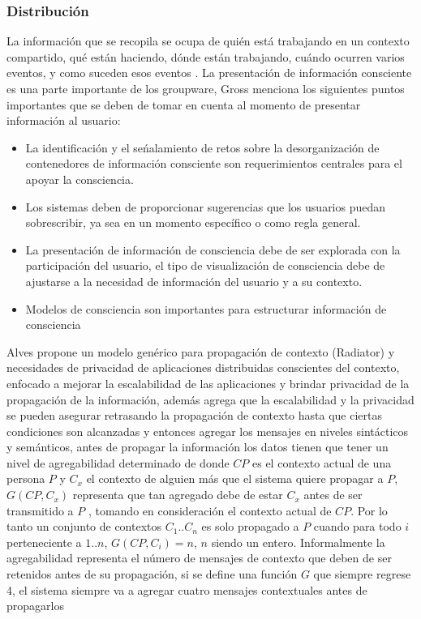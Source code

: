 \subsubsection{Distribuci\'on}
La informaci\'on que se recopila se ocupa de qui\'en est\'a trabajando en un contexto compartido, qu\'e est\'an haciendo, d\'onde est\'an trabajando, cu\'ando ocurren varios eventos, y como suceden esos eventos \cite{ardissono2012context}. La presentaci\'on de informaci\'on consciente es una parte importante de los groupware, Gross\cite{gross2013supporting} menciona los siguientes puntos importantes que se deben de tomar en cuenta al momento de presentar informaci\'on al usuario:
\begin{itemize}
\item La identificaci\'on y el se\'nalamiento de retos sobre la desorganizaci\'on de contenedores de informaci\'on consciente son requerimientos centrales para el apoyar la consciencia.
\item Los sistemas deben de proporcionar sugerencias que los usuarios puedan sobrescribir, ya sea en un momento espec\'ifico o como regla general.
\item La presentaci\'on de informaci\'on de consciencia debe de ser explorada con la participaci\'on del usuario, el tipo de visualizaci\'on de consciencia debe de ajustarse a la necesidad de informaci\'on del usuario y a su contexto.
\item Modelos de consciencia son importantes para estructurar informaci\'on de consciencia
\end{itemize}

Alves \cite{alves2013radiator} propone un modelo gen\'erico para propagaci\'on de contexto (Radiator) y necesidades de privacidad de aplicaciones distribuidas conscientes del contexto, enfocado a mejorar la escalabilidad de las aplicaciones y brindar privacidad de la propagaci\'on de la informaci\'on, adem\'as agrega que la escalabilidad y la privacidad se pueden asegurar retrasando la propagaci\'on de contexto hasta que ciertas condiciones son alcanzadas y entonces agregar los mensajes en niveles sint\'acticos y sem\'anticos, antes de propagar la informaci\'on los datos tienen que tener un nivel de agregabilidad determinado de donde  $CP$ es el contexto actual de una persona $P$ y $C_{x}$ el contexto de alguien m\'as que el sistema quiere propagar a $P$, $G( CP, C_{x} )$ representa que tan agregado debe de estar $C_{x}$ antes de ser transmitido a $P$ , tomando en consideraci\'on el contexto actual de $CP$. Por lo tanto un conjunto de contextos $C_{1}..C_{n}$ es solo propagado a $P$ cuando para todo $i$ perteneciente a $1..n$, $G( CP, C_{i} ) = n$, $n$ siendo un entero. Informalmente la agregabilidad representa el n\'umero de mensajes de contexto que deben de ser retenidos antes de su propagaci\'on, si se define una funci\'on $G$ que siempre regrese 4, el sistema siempre va a agregar cuatro mensajes contextuales antes de propagarlos

